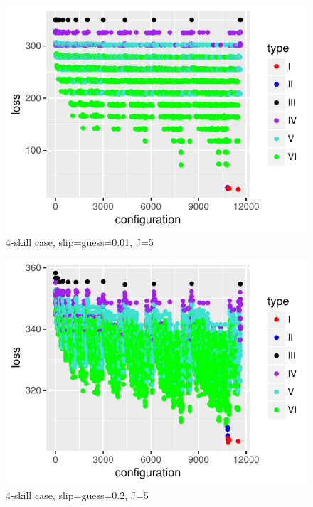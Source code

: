 \documentclass{edm_template}
\begin{document}
\begin{figure}[h!]
  \begin{center}
  \includegraphics[width=\columnwidth]{simResults/Skill4LossBestConfig_theta001_J5.pdf}
  \end{center}
  \caption{4-skill case, slip=guess=0.01, J=5}  
  \label{fig:theta001J5FourSkill}
\end{figure}

\begin{figure}[h!]
  \begin{center}
  \includegraphics[width=\columnwidth]{simResults/Skill4LossBestConfig_theta02_J5.pdf}
  \end{center}
  \caption{4-skill case, slip=guess=0.2, J=5}  
  \label{fig:theta02J5FourSkill}
\end{figure}
\end{document}
